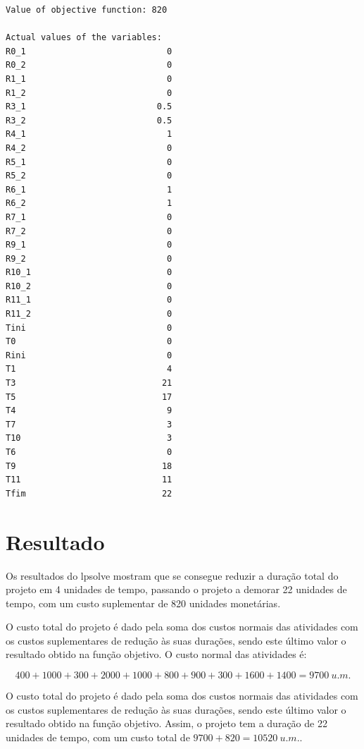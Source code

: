 \begin{verbatim}
Value of objective function: 820

Actual values of the variables:
R0_1                            0
R0_2                            0
R1_1                            0
R1_2                            0
R3_1                          0.5
R3_2                          0.5
R4_1                            1
R4_2                            0
R5_1                            0
R5_2                            0
R6_1                            1
R6_2                            1
R7_1                            0
R7_2                            0
R9_1                            0
R9_2                            0
R10_1                           0
R10_2                           0
R11_1                           0
R11_2                           0
Tini                            0
T0                              0
Rini                            0
T1                              4
T3                             21
T5                             17
T4                              9
T7                              3
T10                             3
T6                              0
T9                             18
T11                            11
Tfim                           22
\end{verbatim}

\section{Resultado}
\label{p5:resultado}

Os resultados do lpsolve mostram que se consegue reduzir a duração total do projeto em 4 unidades de tempo, passando o projeto a demorar 22 unidades de tempo, com um custo suplementar de 820 unidades monetárias.

O custo total do projeto é dado pela soma dos custos normais das atividades com os custos suplementares de redução às suas durações, sendo este último valor o resultado obtido na função objetivo. O custo normal das atividades é:

\begin{displaymath}
400+1000+300+2000+1000+800+900+300+1600+1400 = 9700~u.m.
\end{displaymath}

O custo total do projeto é dado pela soma dos custos normais das atividades com os custos suplementares de redução às suas durações, sendo este último valor o resultado obtido na função objetivo. Assim, o projeto tem a duração de 22 unidades de tempo, com um custo total de $9700 + 820 = 10520~u.m.$.

